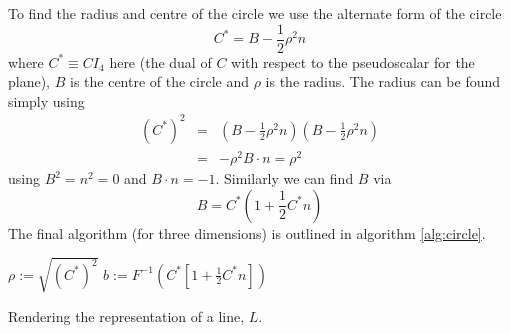 To find the radius and centre of the circle we use the alternate form of the 
circle
\cite{wareham_lasenby}
\[
C^* = B - \frac{1}{2}\rho^2n
\]
where $C^* \equiv CI_4$ here (the dual of $C$ with respect to the pseudoscalar 
for the plane), $B$ is the centre of the circle and $\rho$ is the radius. The
radius can be found simply using
\begin{eqnarray*}
(C^*)^2 & = & \left(B - \frac{1}{2}\rho^2n\right)\left(B - \frac{1}{2}\rho^2n\right) \\
        & = & -\rho^2 B\cdot n = \rho^2
\end{eqnarray*}
using $B^2 = n^2 = 0$ and $B \cdot n = -1$. Similarly we can find $B$ via
\[
B = C^* \left( 1 + \frac{1}{2}C^*n \right)
\]
The final algorithm (for three dimensions) is outlined in algorithm \ref{alg:circle}.


\begin{fancyalg}
\begin{algorithmic}[1]
\STATE $\rho := \sqrt{(C^*)^2}$
\STATE $b := F^{-1}\left(C^* \left[ 1 + \frac{1}{2}C^*n \right]\right)$
\end{algorithmic}
\caption{\label{alg:line}Rendering the representation of a line, $L$.}
\end{fancyalg}

